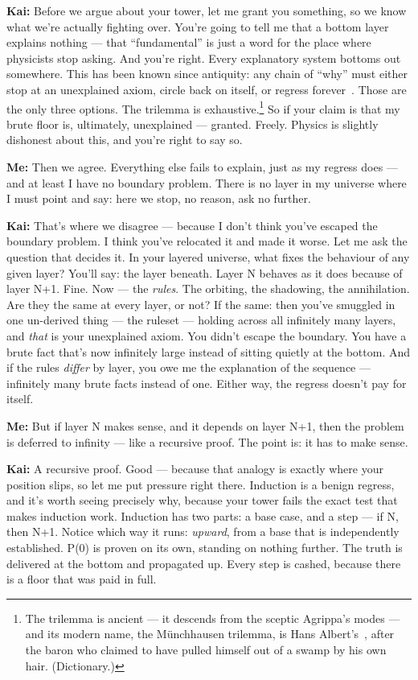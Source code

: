 \documentclass[fontsize=11pt,paper=a4,pagesize=auto,parskip=half-]{scrbook}
\newcommand{\Ixtmp}{}
\DeclareRobustCommand{\Ix}[1]{%
  #1%
  \begingroup
    \lowercase{\gdef\Ixtmp{#1}}%
    \expandafter\index\expandafter{\Ixtmp}%
  \endgroup}
\newcommand{\speaker}[1]{\par\noindent\textbf{#1:}\hspace{0.6em}}
\begin{document}
\speaker{Kai} Before we argue about your tower, let me grant you something, so we know what we're actually fighting over. You're going to tell me that a bottom layer explains nothing --- that ``fundamental'' is just a word for the place where physicists stop asking. And you're right. Every explanatory system bottoms out somewhere. This has been known since antiquity: any chain of ``why'' must either stop at an unexplained axiom, circle back on itself, or regress forever~\cite[I]{sextus}. Those are the only three options. The \Ix{trilemma} is exhaustive.\footnote{The trilemma is ancient --- it descends from the sceptic Agrippa's modes --- and its modern name, the M\"unchhausen trilemma, is Hans Albert's~\cite{albert1985}, after the baron who claimed to have pulled himself out of a swamp by his own hair. (Dictionary.)} So if your claim is that my brute floor is, ultimately, unexplained --- granted. Freely. Physics is slightly dishonest about this, and you're right to say so.

\speaker{Me} Then we agree. Everything else fails to explain, just as my regress does --- and at least I have no boundary problem. There is no layer in my universe where I must point and say: here we stop, no reason, ask no further.

\speaker{Kai} That's where we disagree --- because I don't think you've escaped the boundary problem. I think you've relocated it and made it worse. Let me ask the question that decides it. In your layered universe, what fixes the behaviour of any given layer? You'll say: the layer beneath. Layer N behaves as it does because of layer N+1. Fine. Now --- the \emph{rules}. The orbiting, the shadowing, the annihilation. Are they the same at every layer, or not? If the same: then you've smuggled in one un-derived thing --- the ruleset --- holding across all infinitely many layers, and \emph{that} is your unexplained axiom. You didn't escape the boundary. You have a \Ix{brute fact} that's now infinitely large instead of sitting quietly at the bottom. And if the rules \emph{differ} by layer, you owe me the explanation of the sequence --- infinitely many brute facts instead of one. Either way, the regress doesn't pay for itself.

\speaker{Me} But if layer N makes sense, and it depends on layer N+1, then the problem is deferred to infinity --- like a recursive proof. The point is: it has to make sense.

\speaker{Kai} A recursive proof. Good --- because that analogy is exactly where your position slips, so let me put pressure right there. Induction is a benign regress, and it's worth seeing precisely why, because your tower fails the exact test that makes induction work. Induction has two parts: a base case, and a step --- if N, then N+1. Notice which way it runs: \emph{upward}, from a base that is independently established. P(0) is proven on its own, standing on nothing further. The truth is delivered at the bottom and propagated up. Every step is cashed, because there is a floor that was paid in full.
\end{document}
